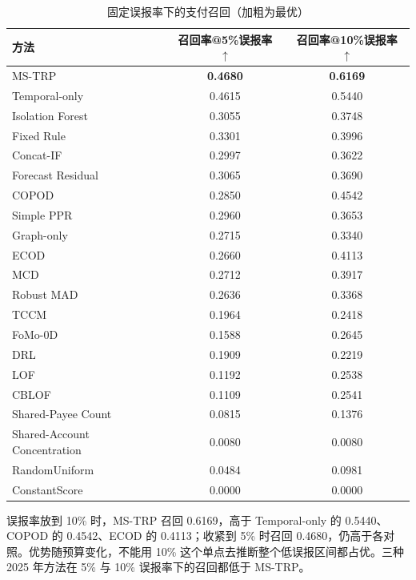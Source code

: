 \documentclass[twocolumn,11pt]{ctexart}
\begin{document}
\begin{table}[t]
\centering\small
\caption{固定误报率下的支付召回（加粗为最优）}
\begin{tabular}{lcc}
\toprule
方法 & 召回率@5\%误报率 $\uparrow$ & 召回率@10\%误报率 $\uparrow$ \\
\midrule
MS-TRP & \textbf{0.4680} & \textbf{0.6169} \\
Temporal-only & 0.4615 & 0.5440 \\
Isolation Forest\cite{ref2} & 0.3055 & 0.3748 \\
Fixed Rule & 0.3301 & 0.3996 \\
Concat-IF\cite{ref2} & 0.2997 & 0.3622 \\
Forecast Residual & 0.3065 & 0.3690 \\
COPOD\cite{ref14} & 0.2850 & 0.4542 \\
Simple PPR\cite{ref29} & 0.2960 & 0.3653 \\
Graph-only & 0.2715 & 0.3340 \\
ECOD\cite{ref13} & 0.2660 & 0.4113 \\
MCD\cite{ref4} & 0.2712 & 0.3917 \\
Robust MAD & 0.2636 & 0.3368 \\
TCCM\cite{ref40} & 0.1964 & 0.2418 \\
FoMo-0D\cite{ref39} & 0.1588 & 0.2645 \\
DRL\cite{ref38} & 0.1909 & 0.2219 \\
LOF\cite{ref3} & 0.1192 & 0.2538 \\
CBLOF\cite{ref5} & 0.1109 & 0.2541 \\
Shared-Payee Count & 0.0815 & 0.1376 \\
Shared-Account Concentration & 0.0080 & 0.0080 \\
RandomUniform & 0.0484 & 0.0981 \\
ConstantScore & 0.0000 & 0.0000 \\
\bottomrule
\end{tabular}
\end{table}

误报率放到 10\% 时，MS-TRP 召回 0.6169，高于 Temporal-only 的 0.5440、COPOD 的 0.4542、ECOD 的 0.4113；收紧到 5\% 时召回 0.4680，仍高于各对照。优势随预算变化，不能用 10\% 这个单点去推断整个低误报区间都占优。三种 2025 年方法在 5\% 与 10\% 误报率下的召回都低于 MS-TRP。
\end{document}
